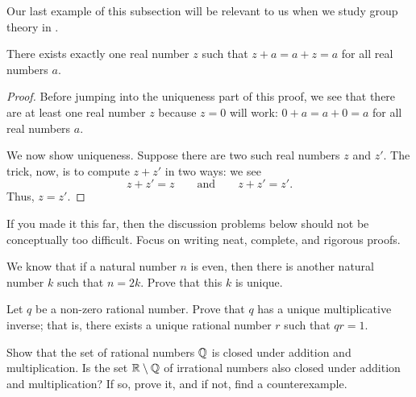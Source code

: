 \documentclass[../notes.tex]{subfiles}
\begin{document}
Our last example of this subsection will be relevant to us when we study group theory in .
\begin{example}
    There exists exactly one real number $z$ such that $z+a=a+z=a$ for all real numbers $a$. %
\end{example}
\begin{proof}
    Before jumping into the uniqueness part of this proof, we see that there are at least one real number $z$ because $z=0$ will work: $0+a=a+0=a$ for all real numbers $a$.

    We now show uniqueness. Suppose there are two such real numbers $z$ and $z'$. The trick, now, is to compute $z+z'$ in two ways: we see
    \[z+z'=z\qquad\text{and}\qquad z+z'=z'.\]
    Thus, $z=z'$.
\end{proof}
If you made it this far, then the discussion problems below should not be conceptually too difficult. Focus on writing neat, complete, and rigorous proofs.
\begin{exercise}
    We know that if a natural number $n$ is even, then there is another natural number $k$ such that $n = 2k$. Prove that this $k$ is unique.
\end{exercise}
\begin{exercise}
    Let $q$ be a non-zero rational number. Prove that $q$ has a unique multiplicative inverse; that is, there exists a unique rational number $r$ such that $qr = 1$.
\end{exercise}
\begin{exercise}
    Show that the set of rational numbers $\mathbb Q$ is closed under addition and multiplication. Is the set $\mathbb R \setminus \mathbb Q$ of irrational numbers also closed under addition and multiplication? If so, prove it, and if not, find a counterexample.
\end{exercise}
\end{document}
